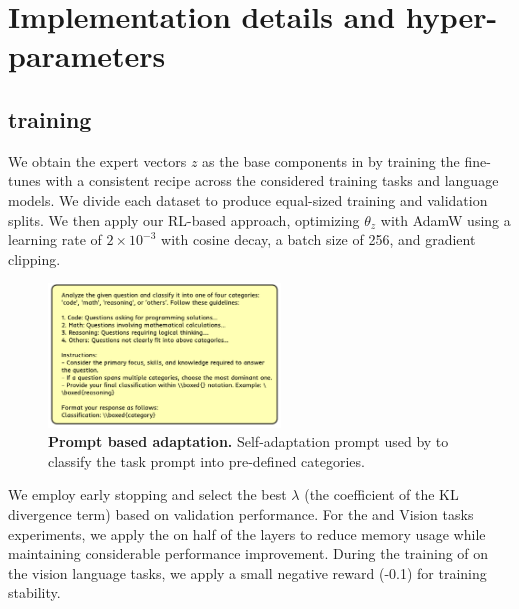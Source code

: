 \section{Implementation details and hyper-parameters}
\label{app:sec:implementation}

\subsection{\svdacro training}
\label{app:sec:svf}
We obtain the expert vectors $z$ as the base components in \implname by training the \svdacro fine-tunes with a consistent recipe across the considered training tasks and language models. 
We divide each dataset to produce equal-sized training and validation splits. We then apply our RL-based approach, optimizing $\theta_z$ with AdamW using a learning rate of $2 \times 10^{-3}$ with cosine decay, a batch size of 256, and gradient clipping. 


\begin{figure}
\vspace{-8mm}
\begin{center}
    \includegraphics[width=0.55\textwidth]{images/visualization/system_prompt.pdf}
  \end{center}
  \vspace{-4mm} 
  \caption{\textbf{Prompt based adaptation.} Self-adaptation prompt used by \implname to classify the task prompt into pre-defined categories.}
  \label{app:fig:sys_prompt}
  \vspace{-8mm}
\end{figure}

We employ early stopping and select the best $\lambda$ (the coefficient of the KL divergence term) based on validation performance. For the \llamaXL and Vision tasks experiments, we apply the \svdacro on half of the layers to reduce memory usage while maintaining considerable performance improvement.
During the training of \llama on the vision language tasks, we apply a small negative reward (-0.1) for training stability.


